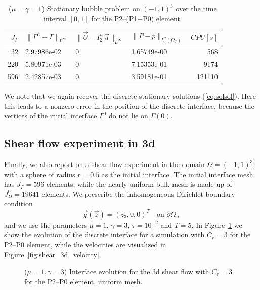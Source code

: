\documentclass[a4paper,11pt,onecolumn]{article}
\newcommand{\errorXx}{\|\Gamma^h - \Gamma\|_{L^\infty}}
\newcommand{\errorUu}[1]{\|\vec U - I^h_{#1}\,\vec u\|_{L^\infty}}
\newcommand{\LerrorPp}{\|P - p\|_{L^2(\Omega_T)}}
\begin{document}
\begin{table}
\center
\begin{tabular}{rlllr}
\hline
$J_\Gamma$ & $\errorXx$ & $\errorUu2$ & $\LerrorPp$ & $CPU[s]$ \\
\hline
 32 & 2.97986e-02 & 0 & 1.65749e-00 &   568 \\
220 & 5.80971e-03 & 0 & 7.15353e-01 &  9174 \\
596 & 2.42857e-03 & 0 & 3.59181e-01 & 121110 \\
\hline
\end{tabular}
\caption{($\mu=\gamma=1$) Stationary bubble problem on $(-1,1)^3$ over the time
interval $[0,1]$ for the P2--(P1+P0) element.}
\label{tab:bubble3Dp2p1p0}
\end{table}

We note that we again recover the discrete stationary solutions
(\ref{eq:solsol}). Here this leads to a nonzero error in the position of the
discrete interface, because the vertices of the initial interface $\Gamma^0$ do
not lie on $\Gamma(0)$.

\subsection{Shear flow experiment in 3d}
Finally, we also report on a shear flow experiment in the domain
$\Omega=(-1,1)^3$, with a sphere of radius $r=0.5$ as the initial interface.
The initial interface mesh has $J_\Gamma = 596$ elements, while the nearly
uniform bulk mesh is made up of $J_\Omega^0 = 19641$ elements. We prescribe the
inhomogeneous Dirichlet boundary condition
\begin{equation*}
\vec g(\vec z)=(z_3,0,0)^T\quad \mbox{on }\partial\Omega\,,
\end{equation*}
and we use the parameters $\mu=1$, $\gamma=3$, $\tau=10^{-2}$ and $T=5$.
In Figure~\ref{fig:shear_3d} we show the evolution of the discrete interface
for a simulation with $C_r=3$ for the P2--P0 element, while the velocities
are visualized in Figure~\ref{fig:shear_3d_velocity}.
\begin{figure}[htbp]
\centering
{}
\caption{($\mu=1,\gamma=3$) Interface evolution for the 3d shear flow with
$C_r=3$ for the P2--P0 element, uniform mesh.}
\label{fig:shear_3d}
\end{figure}
\end{document}
